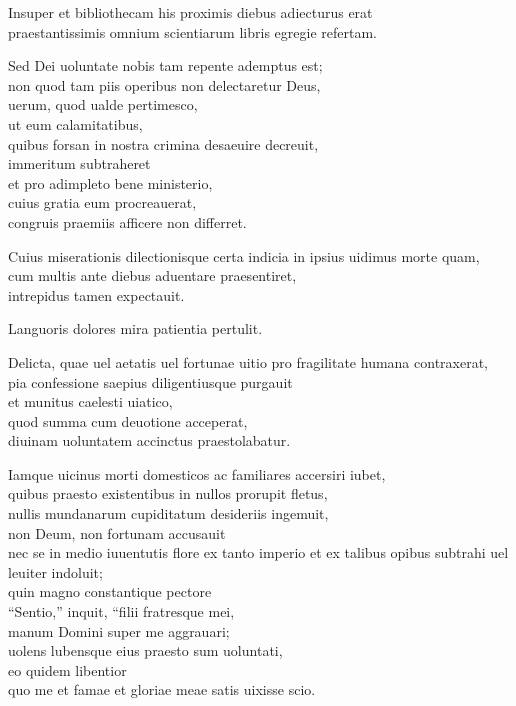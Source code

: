 \documentclass[a5paper,twoside]{article}
\begin{document}
Insuper et bibliothecam his proximis diebus adiecturus erat \\
praestantissimis omnium scientiarum libris egregie refertam.  

Sed Dei uoluntate nobis tam repente ademptus est; \\
non quod tam piis operibus non delectaretur Deus, \\
uerum, quod ualde pertimesco, \\
ut eum calamitatibus, \\
quibus forsan in nostra crimina desaeuire decreuit, \\
immeritum subtraheret \\
et pro adimpleto bene ministerio, \\
cuius gratia eum procreauerat, \\
congruis praemiis afficere non differret.

Cuius miserationis dilectionisque certa indicia in ipsius uidimus morte quam, \\
cum multis ante diebus aduentare praesentiret, \\
intrepidus tamen expectauit.  

Languoris dolores mira patientia pertulit.   

Delicta, quae uel aetatis uel fortunae uitio pro fragilitate humana contraxerat, \\
pia confessione saepius diligentiusque purgauit \\
et munitus caelesti uiatico, \\
quod summa cum deuotione acceperat, \\
diuinam uoluntatem accinctus praestolabatur.  

Iamque uicinus morti domesticos ac familiares accersiri iubet, \\
quibus praesto existentibus in nullos prorupit fletus, \\
nullis mundanarum cupiditatum desideriis ingemuit, \\
non Deum, non fortunam accusauit \\
nec se in medio iuuentutis flore ex tanto imperio et ex talibus opibus subtrahi uel leuiter indoluit; \\
quin magno constantique pectore \\
``Sentio,'' inquit, ``filii fratresque mei, \\
manum Domini super me aggrauari; \\
uolens lubensque eius praesto sum uoluntati, \\
eo quidem libentior \\
quo me et famae et gloriae meae satis uixisse scio.  
\end{document}
